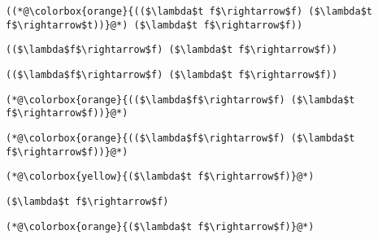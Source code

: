 \documentclass{beamer}
\begin{document}
\begin{frame}[fragile]{\CurrentSection}
\lstset{basicstyle=\ttfamily\small}\lstset{numbers=none}\lstset{language=ML}\begin{lstlisting}
((*@\colorbox{orange}{(($\lambda$t f$\rightarrow$f) ($\lambda$t f$\rightarrow$t))}@*) ($\lambda$t f$\rightarrow$f))
\end{lstlisting}
\pause\lstset{language=ML}\begin{lstlisting}
(($\lambda$f$\rightarrow$f) ($\lambda$t f$\rightarrow$f))
\end{lstlisting}

\end{frame}

\begin{frame}[fragile]{\CurrentSection}
\lstset{basicstyle=\ttfamily\small}\lstset{numbers=none}\lstset{language=ML}\begin{lstlisting}
(($\lambda$f$\rightarrow$f) ($\lambda$t f$\rightarrow$f))
\end{lstlisting}
\pause\lstset{language=ML}\begin{lstlisting}
(*@\colorbox{orange}{(($\lambda$f$\rightarrow$f) ($\lambda$t f$\rightarrow$f))}@*)
\end{lstlisting}

\end{frame}

\begin{frame}[fragile]{\CurrentSection}
\lstset{basicstyle=\ttfamily\small}\lstset{numbers=none}\lstset{language=ML}\begin{lstlisting}
(*@\colorbox{orange}{(($\lambda$f$\rightarrow$f) ($\lambda$t f$\rightarrow$f))}@*)
\end{lstlisting}
\pause\lstset{language=ML}\begin{lstlisting}
(*@\colorbox{yellow}{($\lambda$t f$\rightarrow$f)}@*)
\end{lstlisting}

\end{frame}

\begin{frame}[fragile]{\CurrentSection}
\lstset{basicstyle=\ttfamily\small}\lstset{numbers=none}\lstset{language=ML}\begin{lstlisting}
($\lambda$t f$\rightarrow$f)
\end{lstlisting}
\pause\lstset{language=ML}\begin{lstlisting}
(*@\colorbox{orange}{($\lambda$t f$\rightarrow$f)}@*)
\end{lstlisting}

\end{frame}
\end{document}
